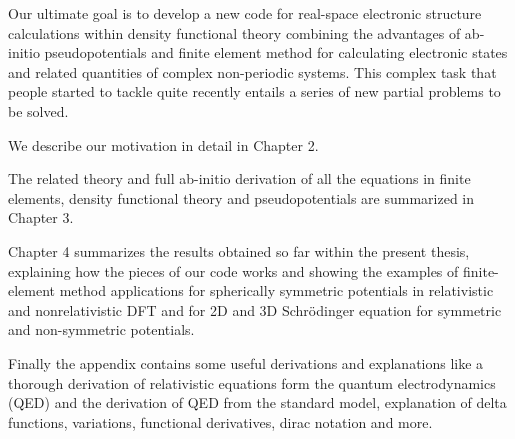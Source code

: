 Our ultimate goal is to develop a new code for real-space electronic structure
calculations within density functional theory combining the advantages
of ab-initio pseudopotentials and finite element method for calculating
electronic states and related quantities of complex non-periodic systems.
This complex task that people started to tackle quite recently
\cite{pask1, pask2, ortiz1, ortiz2}
entails a series of new partial problems to be solved.

We describe our motivation in detail in Chapter 2.

The related theory and full ab-initio derivation of all the equations
in finite elements, density functional theory and pseudopotentials
are summarized in Chapter 3.

Chapter 4 summarizes the results obtained so far within the
present thesis, explaining how the pieces of our code works and showing
the examples of finite-element method applications for spherically symmetric
potentials in relativistic and nonrelativistic DFT and for 2D and 3D
Schr\"odinger equation for symmetric and non-symmetric potentials.

Finally the appendix contains some useful derivations and explanations
like a thorough derivation of relativistic equations form the quantum
electrodynamics (QED) and the derivation of QED from the standard model,
explanation of delta functions, variations, functional derivatives,
dirac notation and more.
